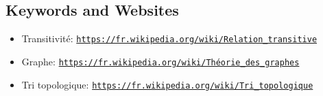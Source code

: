\documentclass[a4paper,11pt]{report}
\newcommand{\BrochureUrlText}[1]{\texttt{#1}}
\begin{document}
{\raggedright

\subsection*{Keywords and Websites}

\begin{itemize}
  \item Transitivité: \href{https://fr.wikipedia.org/wiki/Relation_transitive}{\BrochureUrlText{https://fr.wikipedia.org/wiki/Relation\_transitive}}
  \item Graphe: \href{https://fr.wikipedia.org/wiki/Th\%C3\%A9orie_des_graphes}{\BrochureUrlText{https://fr.wikipedia.org/wiki/Théorie\_des\_graphes}}
  \item Tri topologique: \href{https://fr.wikipedia.org/wiki/Tri_topologique}{\BrochureUrlText{https://fr.wikipedia.org/wiki/Tri\_topologique}}
\end{itemize}


}
\end{document}

